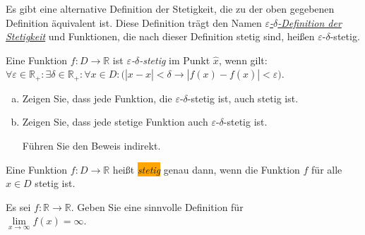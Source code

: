 \noindent
Es gibt eine alternative Definition der Stetigkeit, die zu der oben gegebenen Definition
\"aquivalent ist. Diese Definition tr\"agt den Namen 
\href{http://de.wikipedia.org/wiki/Epsilon-Delta-Kriterium#Stetigkeit_reeller_Funktionen}{\emph{$\varepsilon$-$\delta$-Definition der Stetigkeit}} 
und Funktionen, die nach dieser Definition stetig sind, hei{\ss}en $\varepsilon$-$\delta$-stetig.

\begin{Definition} 
  Eine Funktion $f:D \rightarrow \mathbb{R}$ ist \emph{$\varepsilon$-$\delta$-stetig} im Punkt
  $\widehat{x}$, wenn gilt: 
  \\[0.2cm]
  \hspace*{1.3cm}
  $\forall \varepsilon \in \mathbb{R}_+: \exists \delta \in \mathbb{R}_+: \forall x \in D: 
   \bigl(|x - \widehat{x}| < \delta \rightarrow |f(x) - f(\widehat{x})| < \varepsilon\bigr)$.
  \eod
\end{Definition}


\exercise
\begin{enumerate}[(a)]
\item Zeigen Sie, dass jede Funktion, die $\varepsilon$-$\delta$-stetig ist,
      auch stetig ist.
\item Zeigen Sie, dass jede stetige Funktion auch $\varepsilon$-$\delta$-stetig ist.

      \hint 
      F\"uhren Sie den Beweis indirekt.
      \eox
\end{enumerate}


\begin{Definition} \lb
Eine Funktion $f:D \rightarrow \mathbb{R}$ hei{\ss}t \colorbox{orange}{\emph{stetig}} genau dann, wenn
die Funktion $f$ f\"ur alle $\widehat{x} \in D$ stetig ist.
\eod
\end{Definition}

\exercise
Es sei $f: \mathbb{R} \rightarrow \mathbb{R}$.  Geben Sie eine sinnvolle Definition f\"ur 
\\[0.2cm]
\hspace*{1.3cm}
$\lim\limits_{x\rightarrow\infty} f(x) = \infty$.
\eox


